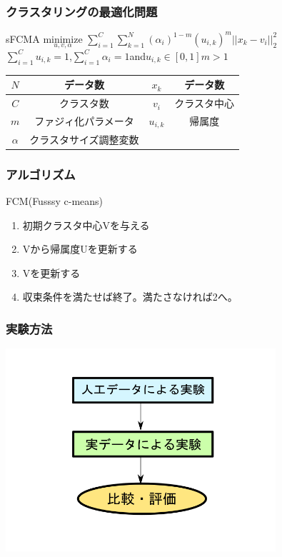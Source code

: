 \documentclass[13pt,dvipdfmx]{beamer}
\begin{document}
\begin{frame}\frametitle{クラスタリングの最適化問題}
  \begin{block}{sFCMA}
    \quad$\underset{u,v,\alpha}{\text{minimize}}$
    $\sum_{i=1}^C\sum_{k=1}^N(\alpha_{i})^{1-m}(u_{i,k})^m||x_k-v_i||_2^2$\\
    $\sum_{i=1}^Cu_{i,k}=1$\;,\;$\sum_{i=1}^C\alpha_{i}=1$\;and\;$u_{i,k}\in[0,1]$\quad$m>1$
  \end{block}
  \begin{center}
\begin{tabular}{c|c||c|c} \hline
	{$N$}&データ数&{$x_k$}&データ数 \\ \hline
	{$C$}&クラスタ数&{$v_i$}&クラスタ中心\\ \hline
	{$m$}&ファジィ化パラメータ&{$u_{i,k}$}&帰属度 \\ \hline
	{$\alpha$}&クラスタサイズ調整変数\\ \hline
\end{tabular}
\end{center}
\end{frame}

\begin{frame}\frametitle{アルゴリズム}
\begin{block}{FCM(Fusssy c-means)}
\begin{enumerate}
 \item 初期クラスタ中心Vを与える
 \item Vから帰属度Uを更新する
 \item Vを更新する
 \item 収束条件を満たせば終了。満たさなければ2へ。
\end{enumerate}
\end{block}
\end{frame}

\begin{frame}\frametitle{実験方法}
\begin{center}
 \includegraphics[width=100mm]{experiment_process.png}
\end{center}
\end{frame}
\end{document}
